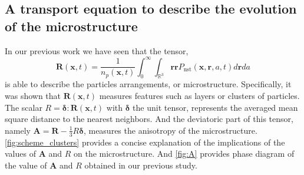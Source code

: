 \subsection{A transport equation to describe the evolution of the microstructure}

In our previous work \citep{fintzi2024buoyancy} we have seen that the tensor,
\begin{equation}
    \textbf{R}(\textbf{x},t)
    = \frac{1}{n_p(\textbf{x},t)}
    \int_0^\infty 
    \int_{\mathbb{R}^3}
    \textbf{rr}
    P_\text{nst}(\textbf{x},\textbf{r},a,t)
    d\textbf{r}
    da
    \label{eq:R}
\end{equation}
is able to describe the particles arrangements, or microstructure.
Specifically, it was shown that $\textbf{R}(\textbf{x},t)$ measures features such as layers or clusters of particles. 
The scalar $R = \bm\delta:\textbf{R}(\textbf{x},t)$ with $\bm\delta$ the unit tensor, represents the averaged mean square distance to the nearest neighbors.
And the deviatoric part of this tensor, namely $\textbf{A} = \textbf{R}-\frac{1}{3}R\bm\delta$, measures the anisotropy of the microstructure. 
\ref{fig:scheme_clusters} provides a concise explanation of the implications of the values of $\textbf{A}$ and $R$ on the microstructure.  
And \ref{fig:A} provides phase diagram of the value of $\textbf{A}$ and $R$ obtained in our previous study. 
